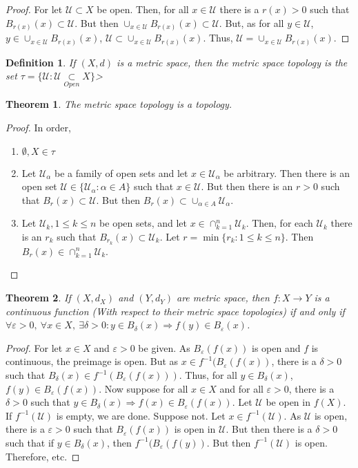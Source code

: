 \documentclass[crop=false,class=book]{standalone}
\theoremstyle{mystyle}
\newtheorem{theorem}{Theorem}[section]
\newtheorem{definition}{Definition}[section]
\begin{document}
\begin{proof}
For let $\mathcal{U} \subset X$ be open. Then, for all $x\in \mathcal{U}$ there is a $r(x)>0$ such that $B_{r(x)}(x) \subset \mathcal{U}$. But then $\cup_{x\in \mathcal{U}}B_{r(x)}(x)\subset \mathcal{U}$. But, as for all $y\in \mathcal{U}$, $y\in \cup_{x\in \mathcal{U}}B_{r(x)}(x)$, $\mathcal{U} \subset \cup_{x\in \mathcal{U}}B_{r(x)}(x)$. Thus, $\mathcal{U}= \cup_{x\in \mathcal{U}}B_{r(x)}(x)$.
\end{proof}
\begin{definition}
If $(X,d)$ is a metric space, then the metric space topology is the set $\tau = \{\mathcal{U}:\mathcal{U}\underset{Open}\subset X\}$>
\end{definition}
\begin{theorem}
The metric space topology is a topology.
\end{theorem}
\begin{proof}
In order,
\begin{enumerate}
\item $\emptyset, X \in \tau$
\item Let $\mathcal{U}_{\alpha}$ be a family of open sets and let $x\in \mathcal{U}_{\alpha}$ be arbitrary. Then there is an open set $\mathcal{U} \in \{\mathcal{U}_{\alpha}:\alpha\in A\}$ such that $x\in \mathcal{U}$. But then there is an $r>0$ such that $B_{r}(x)\subset\mathcal{U}$. But then $B_{r}(x) \subset \cup_{\alpha \in A}\mathcal{U}_{\alpha}$.
\item Let $\mathcal{U}_{k}, 1\leq k \leq n$ be open sets, and let $x\in \cap_{k=1}^{n} \mathcal{U}_k$. Then, for each $\mathcal{U}_k$ there is an $r_{k}$ such that $B_{r_k}(x)\subset \mathcal{U}_{k}$. Let $r = \min\{r_k:1\leq k \leq n\}$. Then $B_{r}(x) \in \cap_{k=1}^{n}\mathcal{U}_k$.
\end{enumerate}
\end{proof}
\begin{theorem}
If $(X,d_X)$ and $(Y,d_Y)$ are metric space, then $f:X\rightarrow Y$ is a continuous function (With respect to their metric space topologies) if and only if $\forall \varepsilon>0,\ \forall x\in X,\ \exists \delta>0:y\in B_{\delta}(x)\Rightarrow f(y) \in B_{\varepsilon}(x)$.
\end{theorem}
\begin{proof}
For let $x\in X$ and $\varepsilon>0$ be given. As $B_{\varepsilon}(f(x))$ is open and $f$ is continuous, the preimage is open. But as $x\in f^{-1}(B_{\varepsilon}(f(x))$, there is a $\delta>0$ such that $B_{\delta}(x)\in f^{-1}(B_{\varepsilon}(f(x)))$. Thus, for all $y \in B_{\delta}(x)$, $f(y) \in B_{\varepsilon}(f(x))$. Now suppose for all $x\in X$ and for all $\varepsilon>0$, there is a $\delta>0$ such that $y\in B_{\delta}(x)\Rightarrow f(x) \in B_{\varepsilon}(f(x))$. Let $\mathcal{U}$ be open in $f(X)$. If $f^{-1}(\mathcal{U})$ is empty, we are done. Suppose not. Let $x\in f^{-1}(\mathcal{U})$. As $\mathcal{U}$ is open, there is a $\varepsilon>0$ such that $B_{\varepsilon}(f(x))$ is open in $\mathcal{U}$. But then there is a $\delta>0$ such that if $y\in B_{\delta}(x)$, then $f^{-1}(B_{\varepsilon}(f(y))$. But then $f^{-1}(\mathcal{U})$ is open. Therefore, etc.
\end{proof}
\end{document}

